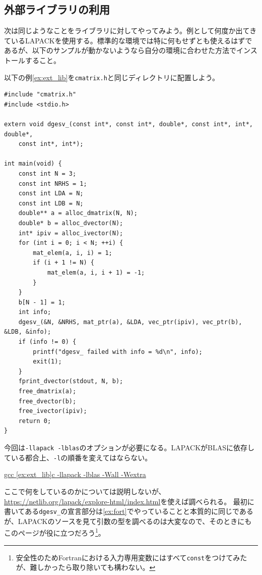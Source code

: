\subsection{外部ライブラリの利用}
次は同じようなことをライブラリに対してやってみよう。例として何度か出てきているLAPACKを使用する。標準的な環境では特に何もせずとも使えるはずであるが、以下のサンプルが動かないようなら自分の環境に合わせた方法でインストールすること。

以下の例\ref{ex:ext_lib}を\texttt{cmatrix.h}と同じディレクトリに配置しよう。

\begin{reidai}\label{ex:ext_lib}
    \begin{verbatim}
#include "cmatrix.h"
#include <stdio.h>

extern void dgesv_(const int*, const int*, double*, const int*, int*, double*,
    const int*, int*);

int main(void) {
    const int N = 3;
    const int NRHS = 1;
    const int LDA = N;
    const int LDB = N;
    double** a = alloc_dmatrix(N, N);
    double* b = alloc_dvector(N);
    int* ipiv = alloc_ivector(N);
    for (int i = 0; i < N; ++i) {
        mat_elem(a, i, i) = 1;
        if (i + 1 != N) {
            mat_elem(a, i, i + 1) = -1;
        }
    }
    b[N - 1] = 1;
    int info;
    dgesv_(&N, &NRHS, mat_ptr(a), &LDA, vec_ptr(ipiv), vec_ptr(b), &LDB, &info);
    if (info != 0) {
        printf("dgesv_ failed with info = %d\n", info);
        exit(1);
    }
    fprint_dvector(stdout, N, b);
    free_dmatrix(a);
    free_dvector(b);
    free_ivector(ipiv);
    return 0;
}
\end{verbatim}
\end{reidai}
今回は\texttt{-llapack -lblas}のオプションが必要になる。LAPACKがBLASに依存している都合上、\texttt{-l}の順番を変えてはならない。

\begin{commandline2}
    \prompt \underline{gcc \ref{ex:ext_lib}c -llapack -lblas -Wall -Wextra}
\end{commandline2} \noindent

ここで何をしているのかについては説明しないが、\url{https://netlib.org/lapack/explore-html/index.html}を使えば調べられる。
最初に書いてある\texttt{dgesv\_}の宣言部分は\ref{ex:fort}でやっていることと本質的に同じであるが、LAPACKのソースを見て引数の型を調べるのは大変なので、そのときにもこのページが役に立つだろう\footnote{安全性のためFortranにおける入力専用変数にはすべて\texttt{const}をつけてみたが、難しかったら取り除いても構わない。}。

